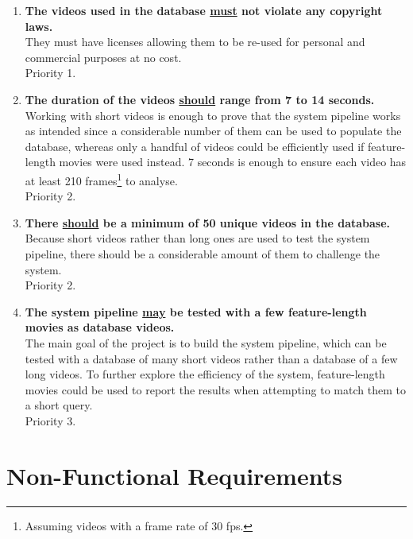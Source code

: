 \begin{enumerate}[label=F\arabic*,resume]

    \item \textbf{The videos used in the database \underline{must} not violate any copyright laws.}\\
    They must have licenses allowing them to be re-used for personal and commercial purposes at no cost.\\
    Priority 1.
    
    \item \textbf{The duration of the videos \underline{should} range from 7 to 14 seconds.}\\
    Working with short videos is enough to prove that the system pipeline works as intended since a considerable number of them can be used to populate the database, whereas only a handful of videos could be efficiently used if feature-length movies were used instead. 7 seconds is enough to ensure each video has at least 210 frames\footnote{Assuming videos with a frame rate of 30 fps.} to analyse.\\
    Priority 2.

    \item \textbf{There \underline{should} be a minimum of 50 unique videos in the database.}\\
    Because short videos rather than long ones are used to test the system pipeline, there should be a considerable amount of them to challenge the system.\\
    Priority 2.
    
    \item \textbf{The system pipeline \underline{may} be tested with a few feature-length movies as database videos.}\\
    The main goal of the project is to build the system pipeline, which can be tested with a database of many short videos rather than a database of a few long videos. To further explore the efficiency of the system, feature-length movies could be used to report the results when attempting to match them to a short query.\\
    Priority 3.
        
\end{enumerate}

\section{Non-Functional Requirements}

